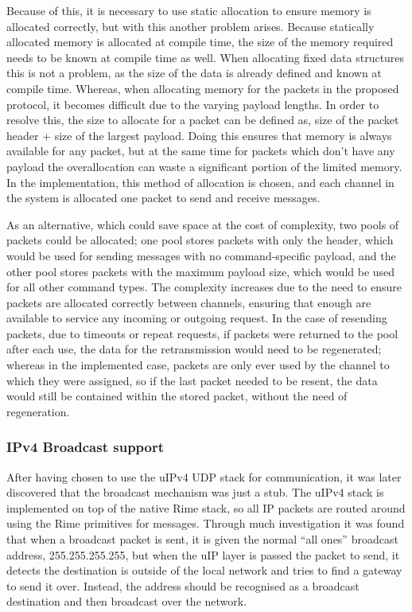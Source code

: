 Because of this, it is necessary to use static allocation to ensure memory is allocated correctly, but with this another problem arises. Because statically allocated memory is allocated at compile time, the size of the memory required needs to be known at compile time as well. When allocating fixed data structures this is not a problem, as the size of the data is already defined and known at compile time. Whereas, when allocating memory for the packets in the proposed protocol, it becomes difficult due to the varying payload lengths. In order to resolve this, the size to allocate for a packet can be defined as, size of the packet header + size of the largest payload. Doing this ensures that memory is always available for any packet, but at the same time for packets which don't have any payload the overallocation can waste a significant portion of the limited memory. In the implementation, this method of allocation is chosen, and each channel in the system is allocated one packet to send and receive messages.

As an alternative, which could save space at the cost of complexity, two pools of packets could be allocated; one pool stores packets with only the header, which would be used for sending messages with no command-specific payload, and the other pool stores packets with the maximum payload size, which would be used for all other command types. The complexity increases due to the need to ensure packets are allocated correctly between channels, ensuring that enough are available to service any incoming or outgoing request. In the case of resending packets, due to timeouts or repeat requests, if packets were returned to the pool after each use, the data for the retransmission would need to be regenerated; whereas in the implemented case, packets are only ever used by the channel to which they were assigned, so if the last packet needed to be resent, the data would still be contained within the stored packet, without the need of regeneration. 

\subsubsection{IPv4 Broadcast support} %
\label{sub:ipv4_broadcast_support}
After having chosen to use the uIPv4 UDP stack for communication, it was later discovered that the broadcast mechanism was just a stub.
The uIPv4 stack is implemented on top of the native Rime stack, so all IP packets are routed around using the Rime primitives for messages. Through much investigation it was found that when a broadcast packet is sent, it is given the normal ``all ones'' broadcast address, 255.255.255.255, but when the uIP layer is passed the packet to send, it detects the destination is outside of the local network and tries to find a gateway to send it over. Instead, the address should be recognised as a broadcast destination and then broadcast over the network.

